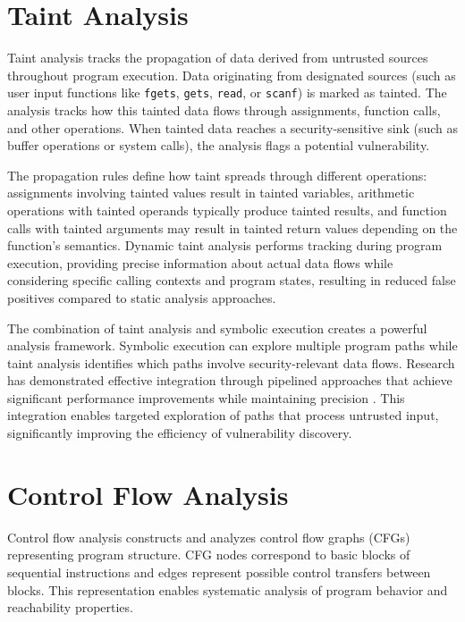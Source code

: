 \section{Taint Analysis}

Taint analysis tracks the propagation of data derived from untrusted sources throughout program execution. Data originating from designated sources (such as user input functions like \texttt{fgets}, \texttt{gets}, \texttt{read}, or \texttt{scanf}) is marked as tainted. The analysis tracks how this tainted data flows through assignments, function calls, and other operations. When tainted data reaches a security-sensitive sink (such as buffer operations or system calls), the analysis flags a potential vulnerability.

The propagation rules define how taint spreads through different operations: assignments involving tainted values result in tainted variables, arithmetic operations with tainted operands typically produce tainted results, and function calls with tainted arguments may result in tainted return values depending on the function's semantics. Dynamic taint analysis performs tracking during program execution, providing precise information about actual data flows while considering specific calling contexts and program states, resulting in reduced false positives compared to static analysis approaches.

The combination of taint analysis and symbolic execution creates a powerful analysis framework. Symbolic execution can explore multiple program paths while taint analysis identifies which paths involve security-relevant data flows. Research has demonstrated effective integration through pipelined approaches that achieve significant performance improvements while maintaining precision \cite{ming_taintpipe_2015}. This integration enables targeted exploration of paths that process untrusted input, significantly improving the efficiency of vulnerability discovery.

\section{Control Flow Analysis}

Control flow analysis constructs and analyzes control flow graphs (CFGs) representing program structure. CFG nodes correspond to basic blocks of sequential instructions and edges represent possible control transfers between blocks. This representation enables systematic analysis of program behavior and reachability properties.

